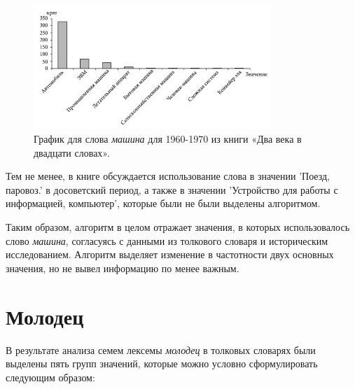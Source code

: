 \begin{figure}[H]
    \centering %
    \includegraphics[width=0.8\textwidth]{img/book/mashina/1960-1970}
    \caption{График для слова \textit{машина} для 1960-1970 из книги «Два века в двадцати словах».}
\end{figure}

Тем не менее, в книге обсуждается использование слова в значении ’Поезд, паровоз.’
в досоветский период, а также в значении ’Устройство для работы с информацией, компьютер’,
которые были не были выделены алгоритмом.

Таким образом, алгоритм в целом отражает значения, в которых использовалось
слово \textit{машина}, согласуясь с данными из толкового словаря и историческим исследованием.
Алгоритм выделяет изменение в частотности двух основных значения, но не вывел информацию по менее важным.

\section*{Молодец}

В результате анализа семем лексемы \textit{молодец} в толковых словарях были выделены пять групп значений,
которые можно условно сформулировать следующим образом:

